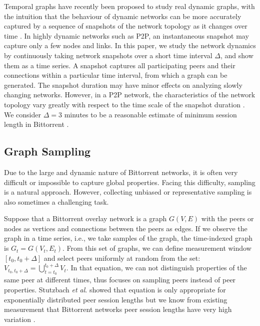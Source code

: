 \documentclass[paper]{ieice}
\begin{document}
Temporal graphs have recently been proposed to study real dynamic graphs, with the intuition that the behaviour of dynamic networks can be more accurately captured by a sequence of snapshots of the network topology as it changes over time \cite{grindodevolvingnet}\cite{Tang2009}.
In highly dynamic networks such as P2P, an instantaneous snapshot may capture only a few nodes and links. 
In this paper, we study the network dynamics by continuously taking network snapshots over a short time interval $\Delta$, and show them as a time series.
A snapshot captures all participating peers and their connections within a particular time interval, from which a graph can be generated.
The snapshot duration may have minor effects on analyzing slowly changing networks.
However, in a P2P network, the characteristics of the network topology vary greatly with respect to the time scale of the snapshot duration \cite{stutzbach2008characterizing}.
We consider $\Delta=3 $ minutes to be a reasonable estimate of minimum session length in Bittorrent \cite{stutzbach2006understanding}. 

\subsection{Graph Sampling}\label{sec:graphsampling}
Due to the large and dynamic nature of Bittorrent networks, it is often very difficult or impossible to capture global properties. 
Facing this difficulty, sampling is a natural approach.
However, collecting unbiased or representative sampling is also sometimes a challenging task.

Suppose that a Bittorrent overlay network is a graph $G(V,E)$ with the peers or nodes as vertices and connections between the peers as edges. 
If we observe the graph in a time series,  i.e., we take samples of the graph, the time-indexed graph is $G_t = G(V_t,E_t)$.   
From this set of graphs, we can define measurement window $[t_0,t_0 + \Delta]$ and select peers uniformly at random from the set: $V_{t_0,t_0+\Delta}=\bigcup^{t_0+\Delta}_{t=t_0} V_t$.
In that equation, we can not distinguish properties of the same peer at different times, thus focuses on sampling peers instead of peer properties. 
Stutzbach \textit{et al}. \cite{stutzbach2007sampling} showed that equation is only appropriate for exponentially distributed  peer session lengths but we know from existing measurement that Bittorrent networks peer session lengths have very high variation \cite{guo2005measurements}. 
\end{document}
